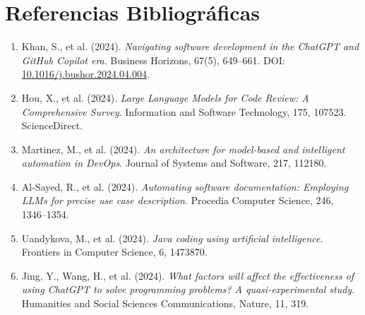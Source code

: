 \documentclass[11pt,a4paper]{article}
\begin{document}
\section{Referencias Bibliográficas}

\begin{enumerate}
    \item Khan, S., et al. (2024). \textit{Navigating software development in the ChatGPT and GitHub Copilot era}. Business Horizons, 67(5), 649--661. DOI: \href{https://doi.org/10.1016/j.bushor.2024.04.004}{10.1016/j.bushor.2024.04.004}.
    \item Hou, X., et al. (2024). \textit{Large Language Models for Code Review: A Comprehensive Survey}. Information and Software Technology, 175, 107523. ScienceDirect.
    \item Martinez, M., et al. (2024). \textit{An architecture for model-based and intelligent automation in DevOps}. Journal of Systems and Software, 217, 112180.
    \item Al-Sayed, R., et al. (2024). \textit{Automating software documentation: Employing LLMs for precise use case description}. Procedia Computer Science, 246, 1346--1354.
    \item Uandykova, M., et al. (2024). \textit{Java coding using artificial intelligence}. Frontiers in Computer Science, 6, 1473870.
    \item Jing, Y., Wang, H., et al. (2024). \textit{What factors will affect the effectiveness of using ChatGPT to solve programming problems? A quasi-experimental study}. Humanities and Social Sciences Communications, Nature, 11, 319.
\end{enumerate}
\end{document}
